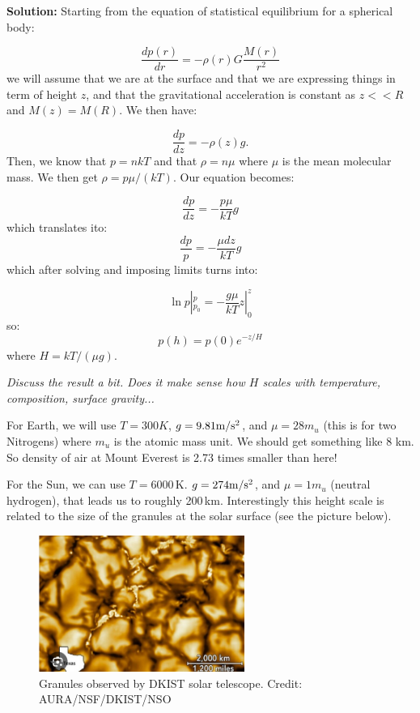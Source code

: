 \documentclass[12pt]{article}
\begin{document}
{\bf Solution:} Starting from the equation of statistical equilibrium for a spherical body:

\begin{equation}
\frac{dp(r)}{dr} = - \rho(r) G\frac{M(r)}{r^2} 
\end{equation}
we will assume that we are at the surface and that we are expressing things in term of height $z$, and that the gravitational acceleration is constant as $z<<R$ and $M(z) = M(R)$. We then have:

\begin{equation}
\frac{dp}{dz} = - \rho(z) g. 
\end{equation}
Then, we know that $p = nkT$ and that $\rho = n \mu$ where $\mu$ is the mean molecular mass. We then get $\rho = p \mu/ (kT)$. Our equation becomes: 

\begin{equation}
\frac{dp}{dz} = - \frac{p \mu}{kT} g 
\end{equation}
which translates ito: 
\begin{equation}
\frac{dp}{p} = - \frac{\mu dz}{kT} g 
\end{equation}
which after solving and imposing limits turns into: 

\begin{equation}
\ln p |_{p_0}^p = - \frac{g \mu}{kT} z|_0^z 
\end{equation}
so:
\begin{equation}
p(h) = p(0) e^{-z/H}
\end{equation}
where $H = kT / (\mu g)$. 

\emph{Discuss the result a bit. Does it make sense how $H$ scales with temperature, composition, surface gravity...}

For Earth, we will use $T = 300 K$, $g=9.81 {\rm m/s^2}$, and $\mu=28 m_u$ (this is for two Nitrogens) where $m_u$ is the atomic mass unit. We should get something like 8 km. So density of air at Mount Everest is 2.73 times smaller than here! 

For the Sun, we can use $T = 6000$\,K. $g = 274 {\rm m/s^2}$, and $\mu=1 m_u$ (neutral hydrogen), that leads us to roughly 200\,km. Interestingly this height scale is related to the size of the granules at the solar surface (see the picture below).

\begin{figure}
\includegraphics[width=0.6\textwidth]{granulation.jpg}
\caption{Granules observed by DKIST solar telescope. Credit: AURA/NSF/DKIST/NSO}
\end{figure}
\end{document}
